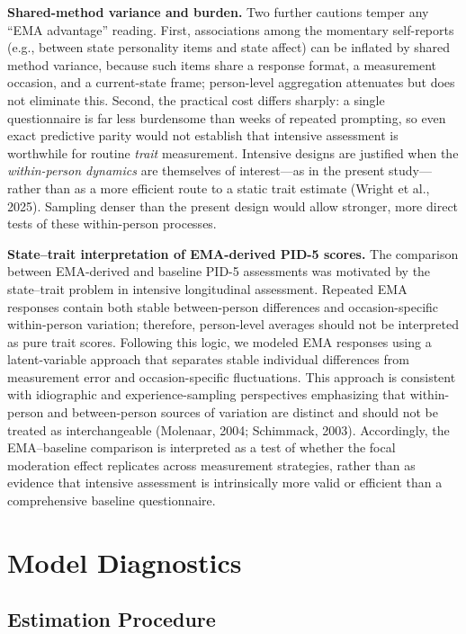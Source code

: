 \documentclass[
  english,
  man,floatsintext]{apa6}
\begin{document}
\textbf{Shared-method variance and burden.} Two further cautions temper any ``EMA advantage'' reading. First, associations among the momentary self-reports (e.g., between state personality items and state affect) can be inflated by shared method variance, because such items share a response format, a measurement occasion, and a current-state frame; person-level aggregation attenuates but does not eliminate this. Second, the practical cost differs sharply: a single questionnaire is far less burdensome than weeks of repeated prompting, so even exact predictive parity would not establish that intensive assessment is worthwhile for routine \emph{trait} measurement. Intensive designs are justified when the \emph{within-person dynamics} are themselves of interest---as in the present study---rather than as a more efficient route to a static trait estimate (Wright et al., 2025). Sampling denser than the present design would allow stronger, more direct tests of these within-person processes.

\textbf{State--trait interpretation of EMA-derived PID-5 scores.} The comparison between EMA-derived and baseline PID-5 assessments was motivated by the state--trait problem in intensive longitudinal assessment. Repeated EMA responses contain both stable between-person differences and occasion-specific within-person variation; therefore, person-level averages should not be interpreted as pure trait scores. Following this logic, we modeled EMA responses using a latent-variable approach that separates stable individual differences from measurement error and occasion-specific fluctuations. This approach is consistent with idiographic and experience-sampling perspectives emphasizing that within-person and between-person sources of variation are distinct and should not be treated as interchangeable (Molenaar, 2004; Schimmack, 2003). Accordingly, the EMA--baseline comparison is interpreted as a test of whether the focal moderation effect replicates across measurement strategies, rather than as evidence that intensive assessment is intrinsically more valid or efficient than a comprehensive baseline questionnaire.

\newpage

\section{Model Diagnostics}\label{s-model-diagnostics}

\subsection{Estimation Procedure}\label{estimation-procedure}
\end{document}
